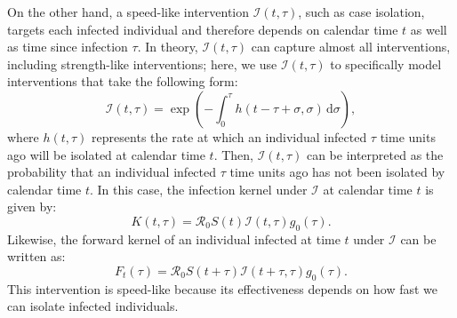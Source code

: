 \documentclass[12pt]{article}
\newcommand{\Rx}[1]{\ensuremath{{\mathcal R}_{#1}}\xspace}
\newcommand{\Ro}{\Rx{0}}
\newcommand{\dd}[1]{\ensuremath{\, \mathrm{d}#1}}
\newcommand{\dsigma}{\dd{\sigma}}
\newcommand{\II}{{\mathcal I}}
\begin{document}
On the other hand, a speed-like intervention $\II(t, \tau)$, such as case isolation, targets each infected individual and therefore depends on calendar time $t$ as well as time since infection $\tau$.
In theory, $\II(t, \tau)$ can capture almost all interventions, including strength-like interventions; here, we use $\II(t, \tau)$ to specifically model interventions that take the following form:
\begin{equation}
\II(t, \tau) = \exp \left(- \int_0^\tau h(t-\tau+\sigma, \sigma) \dsigma \right),
\end{equation}
where $h(t, \tau)$ represents the rate at which an individual infected $\tau$ time units ago will be isolated at calendar time $t$.
Then, $\II(t,\tau)$ can be interpreted as the probability that an individual infected $\tau$ time units ago has not been isolated by calendar time $t$.
In this case, the infection kernel under $\II$ at calendar time $t$ is given by:
\begin{equation}
K(t, \tau) = \Ro S(t) \II(t, \tau) g_0(\tau).
\end{equation}
Likewise, the forward kernel of an individual infected at time $t$ under $\II$ can be written as:
\begin{equation}
F_t(\tau) = \Ro S(t+\tau) \II(t+\tau, \tau) g_0(\tau).
\end{equation}
This intervention is speed-like because its effectiveness depends on how fast we can isolate infected individuals.
\end{document}
